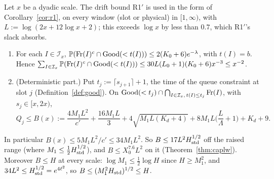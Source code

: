 \begin{theorem}\label{thm:queue}
Let $x$ be a dyadic scale. The drift bound R1$'$ is used in the form of Corollary~\ref{cor:r1}, on every window (slot or physical)
in $[1,\infty)$, with $L:=\log(2x+12\log x+2)$; this exceeds $\log x$ by less than $0.7$, which R1$'$'s slack absorbs.
\begin{enumerate}[label=\textup{(\roman*)}]
\item For each $I\in\mathcal I_x$, $\mathbb{P}(\mathrm{Fr}(I)^c\cap\mathrm{Good}(<t(I)))\le2(K_0+6)e^{-\lambda}$, with $t(I)=b$. Hence
  $\sum_{I\in\mathcal I_x}\mathbb{P}(\mathrm{Fr}(I)^c\cap\mathrm{Good}(<t(I)))\le30L(L_0+1)(K_0+6)x^{-3}\le x^{-2}$.
\item (Deterministic part.) Put $t_j:=\lceil s_{j+1}\rceil+1$, the time of the queue constraint at slot $j$
  (Definition~\ref{def:good}). On $\mathrm{Good}(<t_j)\cap\bigcap_{I\in\mathcal I_x,\,t(I)\le t_j}\mathrm{Fr}(I)$, with $s_j\in[x,2x)$,
\begin{equation}\label{eq:queueB}
Q_j\le B(x):=\frac{4M_1L^2}{c'}+\frac{16M_1L}{3}+4\sqrt{M_1L(K_d+4)}+8M_1L\Big(\frac L\Lambda+1\Big)+K_d+9.
\end{equation}
\end{enumerate}
In particular $B(x)\le5M_1L^2/c'\le34M_1L^2$. So $B\le17L^2H_{\mathrm{std}}^{1/2}$ off the raised range (where $M_1\le\tfrac12H_{\mathrm{std}}^{1/2}$), and
$B\le X_0^{7.6}L^2$ on it (Theorem~\ref{thm:caplw}). Moreover $B\le H$ at every scale: $\log M_1\le\tfrac12\log H$ since
$H\ge M_1^2$, and $34L^2\le H_{\mathrm{std}}^{1/2}=e^{4\ell^2}$, so $B\le(M_1^2H_{\mathrm{std}})^{1/2}\le H$.
\end{theorem}

